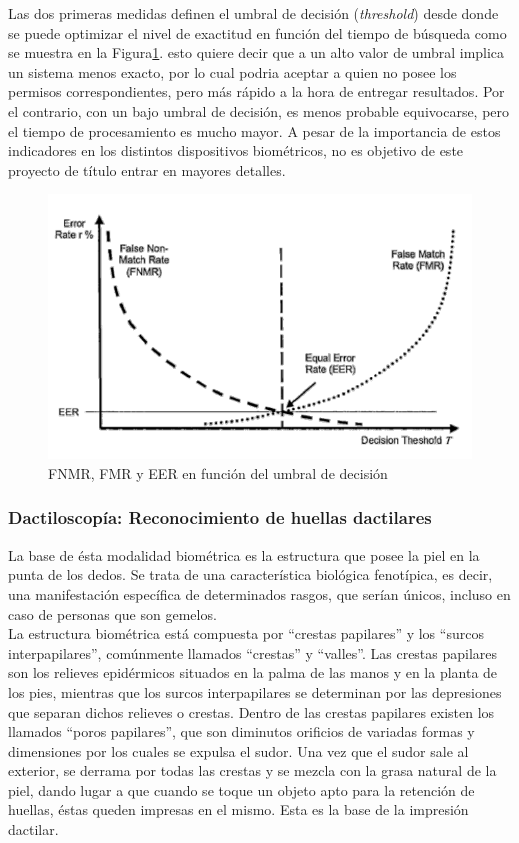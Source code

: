 Las dos primeras medidas definen el umbral de decisión (\textit{threshold}) desde donde  se puede optimizar el nivel de exactitud en función del tiempo de búsqueda como  se muestra en la Figura\ref{umbral}. esto quiere decir que a un alto valor de umbral implica un sistema menos exacto, por lo  cual podria aceptar a quien no posee los permisos correspondientes, pero más rápido a la hora de entregar resultados. Por el contrario, con un bajo umbral de decisión, es menos probable equivocarse, pero el tiempo de procesamiento es mucho mayor. A pesar de la importancia de estos indicadores en los distintos dispositivos biométricos, no es objetivo de este proyecto de título entrar en mayores detalles.


\begin{figure}[H]
\centering
\includegraphics[scale=0.5]{images/capitulo2/umbral.png}
\caption{FNMR, FMR y EER en función del umbral de decisión}
\label{umbral}
\end{figure}

\subsubsection{Dactiloscopía: Reconocimiento de huellas dactilares}

La base de ésta modalidad biométrica es la estructura que posee la piel en la punta de los dedos. Se trata de una característica biológica fenotípica, es decir, una manifestación específica de determinados rasgos, que serían únicos, incluso en caso de personas que son gemelos.\\

La estructura biométrica está compuesta por ``crestas papilares'' y los ``surcos interpapilares'', comúnmente llamados ``crestas'' y ``valles''. Las crestas papilares son los relieves epidérmicos situados en la palma de las manos y en la planta de los pies, mientras que los surcos interpapilares se determinan por las depresiones que separan dichos relieves o crestas. Dentro de las crestas papilares existen los llamados ``poros papilares'', que son diminutos orificios de variadas formas y dimensiones por los cuales se expulsa el sudor. Una vez que el sudor sale al exterior, se derrama por todas las crestas y se mezcla con la grasa natural de la piel, dando lugar a que cuando se toque un objeto apto para la retención de huellas, éstas queden impresas en el mismo. Esta es la base de la impresión dactilar.


